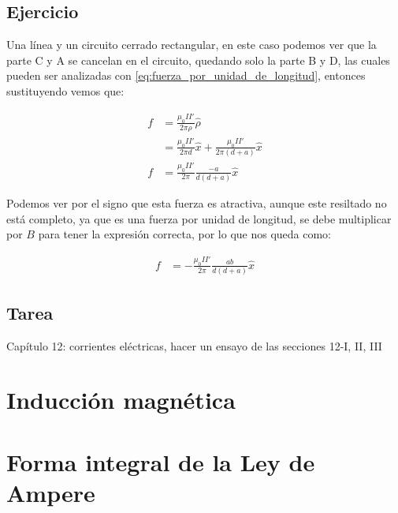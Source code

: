 \documentclass[11pt]{report}
\theoremstyle{plain}
\theoremstyle{definition}
\begin{document}
\section*{Ejercicio}
Una línea y un circuito cerrado rectangular, en este caso podemos ver que la parte C y A se cancelan en el circuito, quedando solo la parte B y D, las cuales pueden ser analizadas con \ref{eq:fuerza_por_unidad_de_longitud}, entonces sustituyendo vemos que:

\begin{align*}
	f &= \frac{\mu_0II'}{2\pi\rho}\hat{\rho}\\
 &= \frac{\mu_0II'}{2\pi d}\hat{x}+ \frac{\mu_0II'}{2\pi(d+a)}\hat{x}\\
 f &= \frac{\mu_0II'}{2\pi}\frac{-a}{d(d+a)} \hat{x}
\end{align*}

Podemos ver por el signo que esta fuerza es atractiva, aunque este resiltado no está completo, ya que es una fuerza por unidad de longitud, se debe multiplicar por $B$ para tener la expresión correcta, por lo que nos queda como:

\begin{align*}
	f &= -\frac{\mu_0II'}{2\pi}\frac{ab}{d(d+a)} \hat{x}
\end{align*}







\section{Tarea}
Capítulo 12: corrientes eléctricas, hacer un ensayo de las secciones 12-I, II, III




\chapter{Inducción magnética}


\chapter{Forma integral de la Ley de Ampere}
\end{document}
